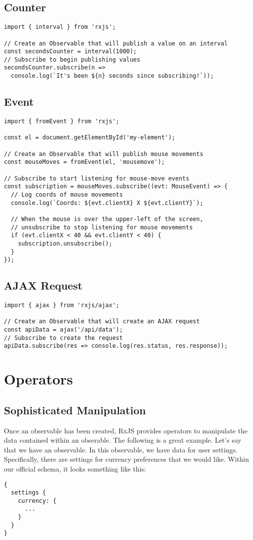 \subsection{Counter}
\begin{lstlisting}
import { interval } from 'rxjs';

// Create an Observable that will publish a value on an interval
const secondsCounter = interval(1000);
// Subscribe to begin publishing values
secondsCounter.subscribe(n =>
  console.log(`It's been ${n} seconds since subscribing!`));
\end{lstlisting}

\subsection{Event}
\begin{lstlisting}
import { fromEvent } from 'rxjs';

const el = document.getElementById('my-element');

// Create an Observable that will publish mouse movements
const mouseMoves = fromEvent(el, 'mousemove');

// Subscribe to start listening for mouse-move events
const subscription = mouseMoves.subscribe((evt: MouseEvent) => {
  // Log coords of mouse movements
  console.log(`Coords: ${evt.clientX} X ${evt.clientY}`);

  // When the mouse is over the upper-left of the screen,
  // unsubscribe to stop listening for mouse movements
  if (evt.clientX < 40 && evt.clientY < 40) {
    subscription.unsubscribe();
  }
});
\end{lstlisting}

\subsection{AJAX Request}
\begin{lstlisting}
import { ajax } from 'rxjs/ajax';

// Create an Observable that will create an AJAX request
const apiData = ajax('/api/data');
// Subscribe to create the request
apiData.subscribe(res => console.log(res.status, res.response));
\end{lstlisting}

\section{Operators}

\subsection{Sophisticated Manipulation}
Once an observable has been created, RxJS provides operators to manipulate 
the data contained within an obserable. The following is a great example. Let's
say that we have an observable. In this observable, we have data for user 
settings. Specifically, there are settings for currency preferences that we 
would like. Within our official schema, it looks something like this: 
\begin{lstlisting}
{
  settings {
    currency: {
      ...
    }
  }
}  
\end{lstlisting}


